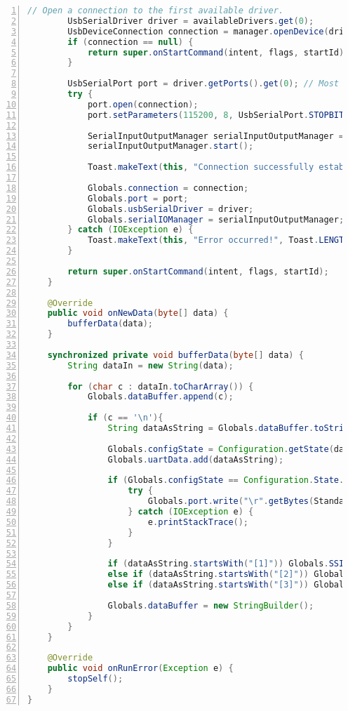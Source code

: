 \documentclass[paper=a4,12pt]{scrreprt}
\begin{document}
\begin{lstlisting}[caption={SerialService Klasse}, captionpos=b, label={listing:android_service}, language=java, numbers=left,
  stepnumber=1]
        // Open a connection to the first available driver.
        UsbSerialDriver driver = availableDrivers.get(0);
        UsbDeviceConnection connection = manager.openDevice(driver.getDevice());
        if (connection == null) {
            return super.onStartCommand(intent, flags, startId);
        }

        UsbSerialPort port = driver.getPorts().get(0); // Most devices have just one port (port 0)
        try {
            port.open(connection);
            port.setParameters(115200, 8, UsbSerialPort.STOPBITS_1, UsbSerialPort.PARITY_NONE);

            SerialInputOutputManager serialInputOutputManager = new SerialInputOutputManager(port, this);
            serialInputOutputManager.start();

            Toast.makeText(this, "Connection successfully established!", Toast.LENGTH_LONG).show();

            Globals.connection = connection;
            Globals.port = port;
            Globals.usbSerialDriver = driver;
            Globals.serialIOManager = serialInputOutputManager;
        } catch (IOException e) {
            Toast.makeText(this, "Error occurred!", Toast.LENGTH_LONG).show();
        }

        return super.onStartCommand(intent, flags, startId);
    }

    @Override
    public void onNewData(byte[] data) {
        bufferData(data);
    }

    synchronized private void bufferData(byte[] data) {
        String dataIn = new String(data);

        for (char c : dataIn.toCharArray()) {
            Globals.dataBuffer.append(c);

            if (c == '\n'){
                String dataAsString = Globals.dataBuffer.toString().trim();

                Globals.configState = Configuration.getState(dataAsString);
                Globals.uartData.add(dataAsString);

                if (Globals.configState == Configuration.State.HIT_ENTER_TO_START) {
                    try {
                        Globals.port.write("\r".getBytes(StandardCharsets.UTF_8), 100);
                    } catch (IOException e) {
                        e.printStackTrace();
                    }
                }

                if (dataAsString.startsWith("[1]")) Globals.SSID = dataAsString.substring(3);
                else if (dataAsString.startsWith("[2]")) Globals.PASSWORD = dataAsString.substring(3);
                else if (dataAsString.startsWith("[3]")) Globals.TOKEN = dataAsString.substring(3);

                Globals.dataBuffer = new StringBuilder();
            }
        }
    }

    @Override
    public void onRunError(Exception e) {
        stopSelf();
    }
}
\end{lstlisting}
\end{document}
